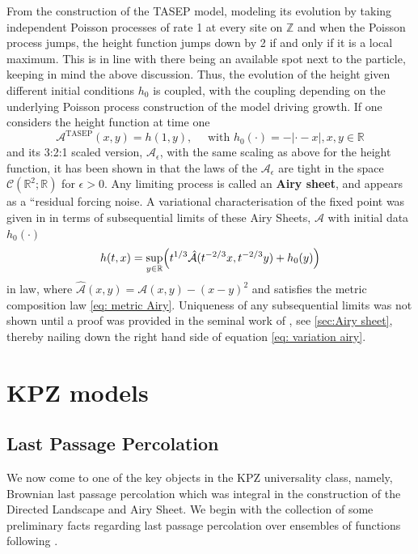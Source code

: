 \documentclass[12pt]{report}
\theoremstyle{plain}
\newcommand{\R}{\ensuremath{\mathbb{R}}}
\newcommand{\Z}{\ensuremath{\mathbb{Z}}}
\begin{document}
From the construction of the TASEP model, modeling its evolution by taking independent Poisson processes of rate 1 at every site on \(\Z\) and when the Poisson process jumps, the height function jumps down by 2 if and only if it is a local maximum. This is in line with there being an available spot next to the particle, keeping in mind the above discussion. Thus, the evolution of the height given different initial conditions \(h_0\) is coupled, with the coupling depending on the underlying Poisson process construction of the model driving growth. If one considers the height function at time one
\[
\mathcal{A}^{\text{TASEP}}(x,y) = h(1,y), \quad \text{ with } h_0(\cdot) = -|\cdot-x|, x,y\in\R
\]
and its 3:2:1 scaled version, \(\mathcal{A}_\epsilon\), with the same scaling as above for the height function, it has been shown in \cite{matetski2021kpz} that the laws of the \(\mathcal{A}_\epsilon\) are tight in the space \(\mathcal{C}(\R^2; \R)\) for \(\epsilon> 0\). 
Any limiting process is called an \textbf{Airy sheet}, and appears as a
\textquotedblleft residual forcing noise. A variational characterisation of the fixed point was given in \cite{matetski2021kpz} in terms of subsequential limits of these Airy Sheets, $\mathcal{A}$ with initial data \(h_0(\cdot)\)
\begin{equation}\label{eq: variation airy}
    h(t, x) = \sup_{y\in\R}\Bigl(t^{1/3}\hat{\mathcal{A}}(t^{-2/3}x, t^{-2/3}y)+h_0(y)\Bigr)
\end{equation}
in law, where \(\hat{\mathcal{A}}(x,y)=\mathcal{A}(x,y)-(x-y)^2\) and satisfies the metric composition law \ref{eq: metric Airy}. Uniqueness of any subsequential limits was not shown until a proof was provided in the seminal work of \cite{DOV}, see \ref{sec:Airy sheet}, thereby nailing down the right hand side of equation \ref{eq: variation airy}.  

\chapter{KPZ models}
\section{Last Passage Percolation}
\indent We now come to one of the key objects in the KPZ universality class, namely, Brownian last passage percolation which was integral in the construction of the Directed Landscape and Airy Sheet. We begin with the collection of some preliminary facts regarding last passage percolation over ensembles of functions following \cite{DOV}.\\
\end{document}
